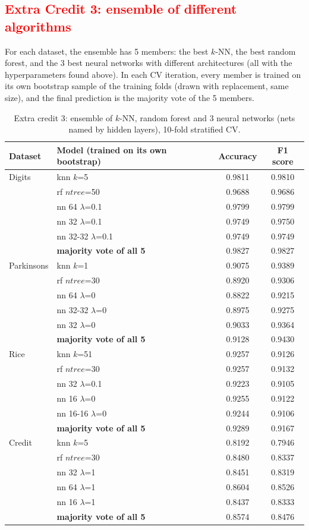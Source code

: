 \documentclass{article}
\begin{document}
\subsection*{\textcolor{red}{Extra Credit 3: ensemble of different algorithms}}

For each dataset, the ensemble has 5 members: the best $k$-NN, the best random forest, and the 3 best neural
networks with different architectures (all with the hyperparameters found above). In each CV iteration, every member
is trained on its own bootstrap sample of the training folds (drawn with replacement, same size), and the final
prediction is the majority vote of the 5 members.

\begin{table}[H]
\centering
\small
\begin{tabular}{llcc}
\toprule
Dataset & Model (trained on its own bootstrap) & Accuracy & F1 score \\
\midrule
Digits & knn $k$=5 & 0.9811 & 0.9810 \\
 & rf $ntree$=50 & 0.9688 & 0.9686 \\
 & nn 64 $\lambda$=0.1 & 0.9799 & 0.9799 \\
 & nn 32 $\lambda$=0.1 & 0.9749 & 0.9750 \\
 & nn 32-32 $\lambda$=0.1 & 0.9749 & 0.9749 \\
 & \textbf{majority vote of all 5} & 0.9827 & 0.9827 \\
\midrule
Parkinsons & knn $k$=1 & 0.9075 & 0.9389 \\
 & rf $ntree$=30 & 0.8920 & 0.9306 \\
 & nn 64 $\lambda$=0 & 0.8822 & 0.9215 \\
 & nn 32-32 $\lambda$=0 & 0.8975 & 0.9275 \\
 & nn 32 $\lambda$=0 & 0.9033 & 0.9364 \\
 & \textbf{majority vote of all 5} & 0.9128 & 0.9430 \\
\midrule
Rice & knn $k$=51 & 0.9257 & 0.9126 \\
 & rf $ntree$=30 & 0.9257 & 0.9132 \\
 & nn 32 $\lambda$=0.1 & 0.9223 & 0.9105 \\
 & nn 16 $\lambda$=0 & 0.9255 & 0.9122 \\
 & nn 16-16 $\lambda$=0 & 0.9244 & 0.9106 \\
 & \textbf{majority vote of all 5} & 0.9289 & 0.9167 \\
\midrule
Credit & knn $k$=5 & 0.8192 & 0.7946 \\
 & rf $ntree$=30 & 0.8480 & 0.8337 \\
 & nn 32 $\lambda$=1 & 0.8451 & 0.8319 \\
 & nn 64 $\lambda$=1 & 0.8604 & 0.8526 \\
 & nn 16 $\lambda$=1 & 0.8437 & 0.8333 \\
 & \textbf{majority vote of all 5} & 0.8574 & 0.8476 \\

\bottomrule
\end{tabular}
\caption{Extra credit 3: ensemble of $k$-NN, random forest and 3 neural networks (nets named by hidden layers), 10-fold stratified CV.}
\end{table}
\end{document}
